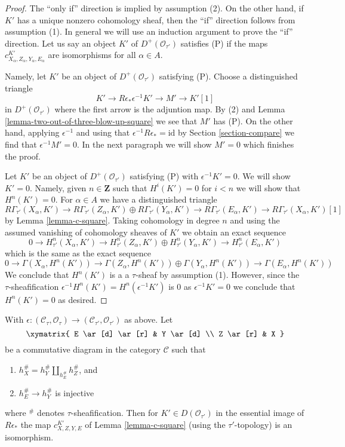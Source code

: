 \begin{proof}
The ``only if'' direction is implied by assumption (2).
On the other hand, if $K'$ has a unique nonzero cohomology sheaf,
then the ``if'' direction follows from assumption (1).
In general we will use an induction argument to prove the
``if'' direction. Let us say an object $K'$ of $D^+(\mathcal{O}_{\tau'})$
satisfies (P) if the maps $c^{K'}_{X_\alpha, Z_\alpha, Y_\alpha, E_\alpha}$
are isomorphisms for all $\alpha \in A$.

\medskip\noindent
Namely, let $K'$ be an object of $D^+(\mathcal{O}_{\tau'})$
satisfying (P). Choose a distinguished triangle
$$
K' \to R\epsilon_*\epsilon^{-1}K' \to M' \to K'[1]
$$
in $D^+(\mathcal{O}_{\tau'})$ where the first arrow is the adjuntion map.
By (2) and Lemma \ref{lemma-two-out-of-three-blow-up-square}
we see that $M'$ has (P). On the other hand, applying
$\epsilon^{-1}$ and using that $\epsilon^{-1}R\epsilon_* = \text{id}$
by Section \ref{section-compare} we find that $\epsilon^{-1}M' = 0$.
In the next paragraph we will show $M' = 0$ which finishes the proof.

\medskip\noindent
Let $K'$ be an object of $D^+(\mathcal{O}_{\tau'})$
satisfying (P) with $\epsilon^{-1}K' = 0$. We will show $K' = 0$.
Namely, given $n \in \mathbf{Z}$ such that $H^i(K') = 0$
for $i < n$ we will show that $H^n(K') = 0$.
For $\alpha \in A$ we have a distinguished triangle
$$
R\Gamma_{\tau'}(X_\alpha, K') \to
R\Gamma_{\tau'}(Z_\alpha, K') \oplus
R\Gamma_{\tau'}(Y_\alpha, K') \to
R\Gamma_{\tau'}(E_\alpha, K') \to
R\Gamma_{\tau'}(X_\alpha, K')[1]
$$
by Lemma \ref{lemma-c-square}. Taking cohomology in degree $n$ and using
the assumed vanishing of cohomology sheaves of $K'$ we obtain an exact
sequence
$$
0 \to
H^n_{\tau'}(X_\alpha, K') \to
H^n_{\tau'}(Z_\alpha, K') \oplus
H^n_{\tau'}(Y_\alpha, K') \to
H^n_{\tau'}(E_\alpha, K')
$$
which is the same as the exact sequence
$$
0 \to
\Gamma(X_\alpha, H^n(K')) \to
\Gamma(Z_\alpha, H^n(K')) \oplus
\Gamma(Y_\alpha, H^n(K')) \to
\Gamma(E_\alpha, H^n(K'))
$$
We conclude that $H^n(K')$ is a a $\tau$-sheaf by assumption (1).
However, since the $\tau$-sheafification
$\epsilon^{-1}H^n(K') = H^n(\epsilon^{-1}K')$ is $0$ as
$\epsilon^{-1}K' = 0$
we conclude that $H^n(K') = 0$ as desired.
\end{proof}

\begin{lemma}
\label{lemma-descent-squares-helper}
With $\epsilon : (\mathcal{C}_\tau, \mathcal{O}_\tau) \to
(\mathcal{C}_{\tau'}, \mathcal{O}_{\tau'})$ as above. Let
$$
\xymatrix{
E \ar[d] \ar[r] & Y \ar[d] \\
Z \ar[r] & X
}
$$
be a commutative diagram in the category $\mathcal{C}$ such that
\begin{enumerate}
\item $h_X^\# = h_Y^\# \amalg_{h_E^\#} h_Z^\#$, and
\item $h_E^\# \to h_Y^\#$ is injective
\end{enumerate}
where ${}^\#$ denotes $\tau$-sheafification. Then for
$K' \in D(\mathcal{O}_{\tau'})$ in the essential image of
$R\epsilon_*$ the map $c^{K'}_{X, Z, Y, E}$ of Lemma \ref{lemma-c-square}
(using the $\tau'$-topology) is an isomorphism.
\end{lemma}

